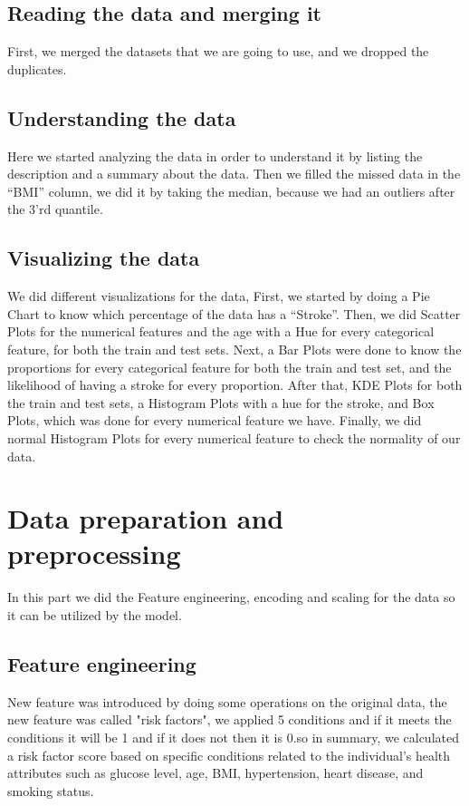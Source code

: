 \documentclass{article}
\begin{document}
\subsection{Reading the data and merging it}
First, we merged the datasets that we are going to use, and we dropped the duplicates.

\subsection{Understanding the data}
Here we started analyzing the data in order to understand it by listing the description and a summary about the data. Then we filled the missed data in the “BMI” column, we did it by taking the median, because we had an outliers after the 3’rd quantile.



\subsection{Visualizing the data}
We did different visualizations for the data, First, we started by doing a Pie Chart to know which percentage of the data has a “Stroke”. Then, we did Scatter Plots for the numerical features and the age with a Hue for every categorical feature, for both the train and test sets. Next, a Bar Plots were done to know the proportions for every categorical feature for both the train and test set, and the likelihood of having a stroke for every proportion. After that, KDE Plots for both the train and test sets, a Histogram Plots with a hue for the stroke, and Box Plots, which was done for every numerical feature we have. Finally, we did normal Histogram Plots for every numerical feature to check the normality of our data.

\section{Data preparation and preprocessing}
In this part we did the Feature engineering, encoding and scaling for the data so it can be utilized by the model.

\subsection{Feature engineering}
New feature was introduced by doing some operations on the original data, the new feature was called "risk factors", we applied 5 conditions and if it meets the conditions it will be 1 and if it does not then it is 0.so in summary, we  calculated a risk factor score based on specific conditions related to the individual's health attributes such as glucose level, age, BMI, hypertension, heart disease, and smoking status.
\end{document}
